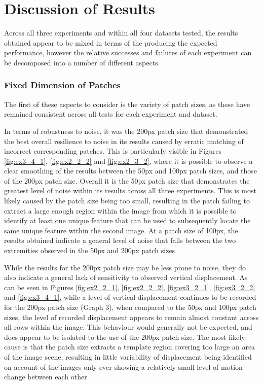 \clearpage
\section{Discussion of Results}

Across all three experiments and within all four datasets tested, the results obtained appear to be mixed in terms of the producing the expected performance, however the relative successes and failures of each experiment can be decomposed into a number of different aspects.

\subsubsection{Fixed Dimension of Patches}

The first of these aspects to consider is the variety of patch sizes, as these have remained consistent across all tests for each experiment and dataset. 

In terms of robustness to noise, it was the 200px patch size that demonstrated the best overall resilience to noise in its results caused by erratic matching of incorrect corresponding patches. This is particularly visible in Figures \ref{fig:ex3_4_1}, \ref{fig:ex2_2_2} and \ref{fig:ex2_3_2}, where it is possible to observe a clear smoothing of the results between the 50px and 100px patch sizes, and those of the 200px patch size. Overall it is the 50px patch size that demonstrates the greatest level of noise within its results across all three experiments. This is most likely caused by the patch size being too small, resulting in the patch failing to extract a large enough region within the image from which it is possible to identify at least one unique feature that can be used to subsequently locate the same unique feature within the second image. At a patch size of 100px, the results obtained indicate a general level of noise that falls between the two extremities observed in the 50px and 200px patch sizes. 

While the results for the 200px patch size may be less prone to noise, they do also indicate a general lack of sensitivity to observed vertical displacement. As can be seen in Figures \ref{fig:ex2_2_1}, \ref{fig:ex2_2_2}, \ref{fig:ex3_2_1}, \ref{fig:ex3_2_2} and \ref{fig:ex3_4_1}, while a level of vertical displacement continues to be recorded for the 200px patch size (Graph 3), when compared to the 50px and 100px patch sizes, the level of recorded displacement appears to remain almost constant across all rows within the image. This behaviour would generally not be expected, and does appear to be isolated to the use of the 200px patch size. The most likely cause is that the patch size extracts a template region covering too large an area of the image scene, resulting in little variability of displacement being identified on account of the images only ever showing a relatively small level of motion change between each other. 


